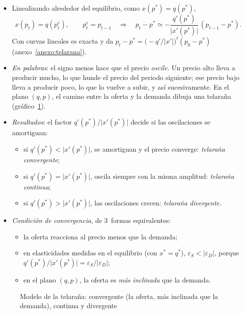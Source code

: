 \documentclass[11pt]{article}
\begin{document}
\begin{itemize}
\item Linealizando alrededor del equilibrio, como $x(p^*)=q(p^*)$,
  \begin{equation}
  x(p_t)=q(p^e_t),\qquad p^e_t=p_{t-1}\quad\Longrightarrow\quad p_t-p^*\simeq-\frac{q'(p^*)}{\lvert x'(p^*)\rvert}\,(p_{t-1}-p^*). \label{eq:telarana}
  \end{equation}
  Con curvas lineales es exacta y da $p_t-p^*=\big(-q'/\lvert x'\rvert\big)^{t}(p_0-p^*)$ (anexo~\ref{anexo:telarana}).
\item \emph{En palabras}: el signo menos hace que el precio \emph{oscile}. Un precio alto lleva a producir mucho, lo que hunde el precio del periodo siguiente; ese precio bajo lleva a producir poco, lo que lo vuelve a subir, y así sucesivamente. En el plano $(q,p)$, el camino entre la oferta y la demanda dibuja una telaraña (gráfico~\ref{fig:telarana}).
\item \emph{Resultados}: el factor $q'(p^*)/\lvert x'(p^*)\rvert$ decide si las oscilaciones se amortiguan:
  \begin{itemize}
  \item si $q'(p^*)<\lvert x'(p^*)\rvert$, se amortiguan y el precio converge: \emph{telaraña convergente};
  \item si $q'(p^*)=\lvert x'(p^*)\rvert$, oscila siempre con la misma amplitud: \emph{telaraña continua};
  \item si $q'(p^*)>\lvert x'(p^*)\rvert$, las oscilaciones crecen: \emph{telaraña divergente}.
  \end{itemize}
\item \emph{Condición de convergencia}, de 3~formas equivalentes:
  \begin{itemize}
  \item la oferta reacciona al precio menos que la demanda;
  \item en elasticidades medidas en el equilibrio (con $x^*=q^*$), $\varepsilon_S<\lvert\varepsilon_D\rvert$, porque $q'(p^*)/\lvert x'(p^*)\rvert=\varepsilon_S/\lvert\varepsilon_D\rvert$;
  \item en el plano $(q,p)$, la oferta es \emph{más inclinada} que la demanda.
  \end{itemize}
\end{itemize}

\begin{figure}[H]
\centering
\caption{Modelo de la telaraña: convergente (la oferta, más inclinada que la demanda), continua y divergente}\label{fig:telarana}
\end{figure}
\end{document}
